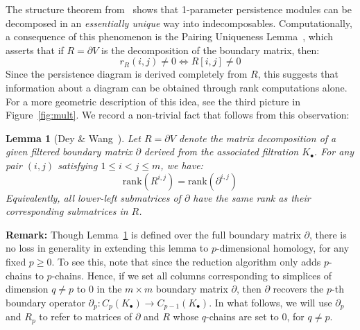 \documentclass[10pt]{article}
\numberwithin{equation}{section}
\newcommand{\+}{%
	\raisebox{0.18ex}{\scaleobj{0.55}{+}}
}
\newtheorem{lemma}{Lemma}
\theoremstyle{definition}
\begin{document}
The structure theorem from~\cite{zomorodian2004computing} shows that 1-parameter persistence modules can be decomposed in an \emph{essentially unique} way into indecomposables. Computationally, a consequence of this phenomenon is the Pairing Uniqueness Lemma~\cite{cohen2006vines}, which asserts that if $R = \partial V$ is the decomposition of the boundary matrix, then:  
$$ r_R(i,j) \neq 0 \Leftrightarrow R[i,j] \neq 0 $$
Since the persistence diagram is derived completely from $R$, this suggests that information about a diagram can be obtained through rank computations alone.
For a more geometric description of this idea, see the third picture in Figure~\ref{fig:mult}. We record a non-trivial fact that follows from this observation: 
\begin{lemma}[Dey \& Wang~\cite{dey2022computational}]\label{lemma:rank}
Let $R = \partial V$ denote the matrix decomposition of a given filtered boundary matrix $\partial$ derived from the associated filtration $K_\bullet$. For any pair $(i,j)$ satisfying $1 \leq i < j \leq m$, we have:
	\begin{equation}\label{eq:lower_left_rank}
		\mathrm{rank}(R^{i,j}) = \mathrm{rank}(\partial^{i, j})
	\end{equation}
Equivalently, all lower-left submatrices of $\partial$ have the same rank as their corresponding submatrices in $R$. 
\end{lemma}
\noindent \textbf{Remark: } Though Lemma~\ref{lemma:rank} is defined over the full boundary matrix $\partial$, there is no loss in generality in extending this lemma to $p$-dimensional homology, for any fixed $p \geq 0$. To see this, note that since the reduction algorithm only adds $p$-chains to $p$-chains. Hence, if we set all columns corresponding to simplices of dimension $q \neq p$ to $0$ in the $m \times m$ boundary matrix $\partial$, then $\partial$ recovers the $p$-th boundary operator $\partial_p : C_p(K_\bullet) \to C_{p-1}(K_\bullet)$. 
In what follows, we will use $\partial_p$ and $R_p$ to refer to matrices of $\partial$ and $R$ whose $q$-chains are set to $0$, for $q \neq p $. 
\end{document}
